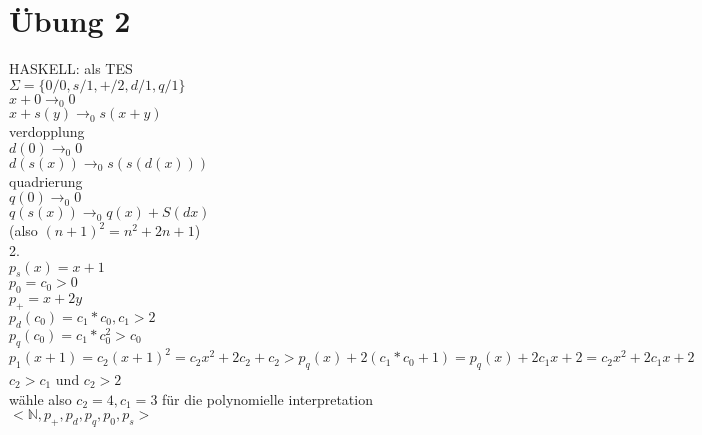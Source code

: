 \documentclass{article}
\begin{document}
	\section{Übung 2}
	HASKELL: als TES\\
	$\Sigma=\{0/0,s/1,+/2,d/1,q/1\}$\\
	$x+0\to_0 0$\\
	$x+s(y)\to_0 s(x+y)$\\
	verdopplung\\
	$d(0)\to_0 0$\\
	$d(s(x))\to_0 s(s(d(x)))$\\
	quadrierung\\
	$q(0)\to_0 0$\\
	$q(s(x))\to_0 q(x)+S(d x)$\\
	(also $(n+1)^2 = n^2+2n+1$)\\
	2.\\
	$p_s (x)=x+1$\\
	$p_0 =c_0>0$\\
	$p_+ = x+2y$\\
	$p_d(c_0) = c_1*c_0, c_1>2$\\
	$p_q(c_0) = c_1*c_0^2>c_0$\\
	$p_1(x+1)= c_2(x+1)^2 = c_2x^2+2c_2+c_2>p_q(x)+2(c_1*c_0+1)=p_q(x)+2c_1x+2 = c_2x^2+2c_1x+2$\\
	$c_2>c_1$ und $c_2>2$\\
	wähle also $c_2=4, c_1=3$
	für die polynomielle interpretation $<\mathbb{N}, p_+, p_d, p_q,p_0,p_s>$
\end{document}
